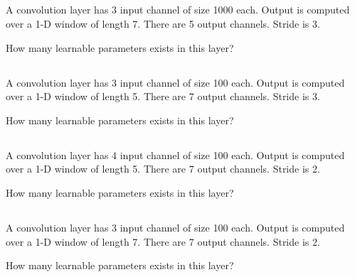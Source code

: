 \begin{frame}
\section{}
A convolution layer has 3 input channel of size 1000 each. Output is computed over a 1-D window of length 7. There are 5 output channels. Stride is 3.

    How many learnable parameters exists in this layer?

\end{frame}



\begin{frame}
\section{}
A convolution layer has 3 input channel of size 100 each. Output is computed over a 1-D window of length 5. There are 7 output channels. Stride is 3.

    How many learnable parameters exists in this layer?

\end{frame}


\begin{frame}
\section{}
A convolution layer has 4 input channel of size 100 each. Output is computed over a 1-D window of length 5. There are 7 output channels. Stride is 2.

    How many learnable parameters exists in this layer?

\end{frame}


\begin{frame}
\section{}
A convolution layer has 3 input channel of size 100 each. Output is computed over a 1-D window of length 7. There are 7 output channels. Stride is 2.

    How many learnable parameters exists in this layer?

\end{frame}
